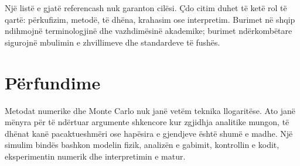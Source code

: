 \documentclass[11pt,oneside,openany]{book}
\begin{document}
Një listë e gjatë referencash nuk garanton cilësi. Çdo citim duhet të ketë rol të qartë: përkufizim, metodë, të dhëna, krahasim ose interpretim. Burimet në shqip ndihmojnë terminologjinë dhe vazhdimësinë akademike; burimet ndërkombëtare sigurojnë mbulimin e zhvillimeve dhe standardeve të fushës.



\backmatter
\chapter*{Përfundime}
Metodat numerike dhe Monte Carlo nuk janë vetëm teknika llogaritëse. Ato janë mënyra për të ndërtuar argumente shkencore kur zgjidhja analitike mungon, të dhënat kanë pacaktueshmëri ose hapësira e gjendjeve është shumë e madhe. Një simulim bindës bashkon modelin fizik, analizën e gabimit, kontrollin e kodit, eksperimentin numerik dhe interpretimin e matur.
\end{document}
